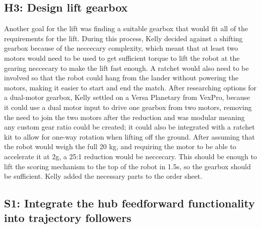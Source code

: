 \documentclass{article}
\begin{document}
\subsection{H3: Design lift gearbox}

Another goal for the lift was finding a suitable gearbox that would fit all of the requirements for the lift. During this process, Kelly decided against a shifting gearbox because of the neccecary complexity, which meant that at least two motors would need to be used to get sufficient torque to lift the robot at the gearing neccecary to make the lift fast enough. A ratchet would also need to be involved so that the robot could hang from the lander without powering the motors, making it easier to start and end the match. After researching options for a dual-motor gearbox, Kelly settled on a Versa Planetary from VexPro, because it could use a dual motor input to drive one gearbox from two motors, removing the need to join the two motors after the reduction and was modular meaning any custom gear ratio could be created; it could also be integrated with a ratchet kit to allow for one-way rotation when lifting off the ground. After assuming that the robot would weigh the full 20 kg, and requiring the motor to be able to accelerate it at 2g, a 25:1 reduction would be neccecary. This should be enough to lift the scoring mechanism to the top of the robot in 1.5s, so the gearbox should be sufficient. Kelly added the necessary parts to the order sheet.
\subsection{S1: Integrate the hub feedforward functionality into trajectory followers}
\end{document}
